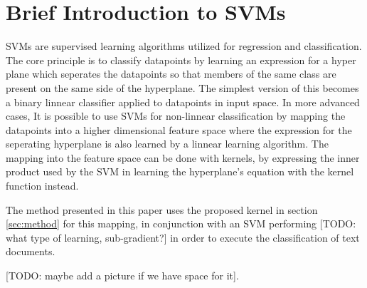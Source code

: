 \section{Brief Introduction to SVMs} \label{sec:background}
SVMs are supervised learning algorithms utilized for regression and classification. The core principle is to classify datapoints by learning an expression for a hyper plane which seperates the datapoints so that members of the same class are present on the same side of the hyperplane. The simplest version of this becomes a binary linnear classifier applied to datapoints in input space. In more advanced cases, It is possible to use SVMs for non-linnear classification by mapping the datapoints into a higher dimensional feature space where the expression for the seperating hyperplane is also learned by a linnear learning algorithm. The mapping into the feature space can be done with kernels, by expressing the inner product used by the SVM in learning the hyperplane's equation with the kernel function instead.  

The method presented in this paper uses the proposed kernel in section \ref{sec:method} for this mapping, in conjunction with an SVM performing [TODO: what type of learning, sub-gradient?] in order to execute the classification of text documents. 

[TODO: maybe add a picture if we have space for it].

